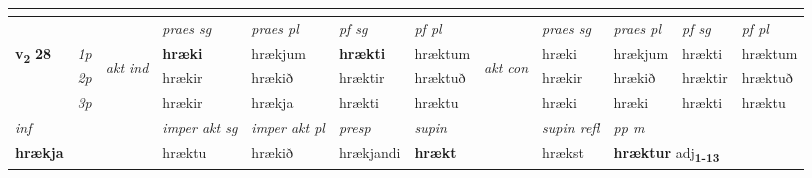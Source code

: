 \begin{longtable}[l]{X>{\footnotesize\itshape}llXXXXlXXXX}
\midrule
   
  & \\
   \midrule
 & &   & \textit{praes sg}  & \textit{praes pl}    & \textit{ pf sg} & \textit{pf pl} & & \textit{praes sg}  & \textit{praes pl}    & \textit{pf sg} & \textit{pf pl }  \\ \cmidrule{4-7} \cmidrule{9-12}
 \multirow{2}{*}{{{\textbf{v{\textsubscript{2}}} \Large{\textbf{28}}}}}  & 1p & \multirow{3}{*}{\begin{turn}{90}\textit{akt ind}\end{turn}} & \textbf{hræki} & hrækjum & \textbf{hrækti} & hræktum & \multirow{3}{*}{\begin{turn}{90}\textit{akt con}\end{turn}} &hræki & hrækjum & hrækti & hræktum\\*
 & 2p &  &  hrækir  & hrækið & hræktir & hræktuð & & hrækir & hrækið & hræktir & hræktuð \\*
 & 3p &  & hrækir & hrækja & hrækti & hræktu & & hræki & hræki& hrækti & hræktu \\*
\cmidrule{4-7} \cmidrule{9-12}

   {\textit{inf}} & &  & \textit{imper akt sg} & \textit{imper akt pl}   & \textit{presp} & \textit{supin} && \textit{supin refl} & \textit{pp m} \\*
  {\textbf{hrækja}} & && hræktu  & hrækið   & hrækjandi &  \textbf{hrækt} && hrækst & \multicolumn{2}{l}{\textbf{hræktur} adj\textbf{\textsubscript{1-13}}} \\*

\midrule


\end{longtable}
